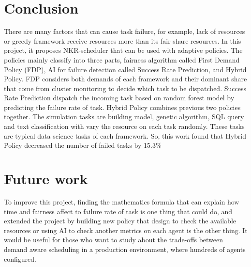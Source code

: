\documentclass[12pt,oneside,openright,a4paper]{cpe-english-project}
\begin{document}
\section{Conclusion}
\hspace{10mm}There are many factors that can cause task failure, for example, lack of resources or greedy framework receive resources more than its fair share resources. In this project, it proposes NKR-scheduler that can be used with adaptive policies. The policies mainly classify into three parts, fairness algorithm called First Demand Policy (FDP), AI for failure detection called Success Rate Prediction, and Hybrid Policy. FDP considers both demands of each framework and their dominant share that come from cluster monitoring to decide which task to be dispatched. Success Rate Prediction dispatch the incoming task based on random forest model by predicting the failure rate of task. Hybrid Policy combines previous two policies together. The simulation tasks are building model, genetic algorithm, SQL query and text classification with vary the resource on each task randomly. These tasks are typical data science tasks of each framework. So, this work found that Hybrid Policy decreased the number of failed tasks by 15.3\%

\section{Future work}
\hspace{10mm}To improve this project, finding the mathematics formula that can explain how time and fairness affect to failure rate of task is one thing that could do, and extended the project by building new policy that design to check the available resources or using AI to check another metrics on each agent is the other thing. It would be useful for those who want to study about the trade-offs between demand aware scheduling in a production environment, where hundreds of agents configured.


\nocite{*}


\end{document}

